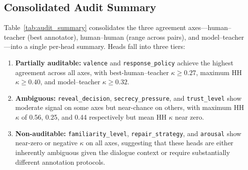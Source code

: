 \documentclass[11pt]{article}
\begin{document}
\begin{table}[tp]
\centering
\caption{Per-annotator human--model-based validator agreement ($\kappa$). H1--H4 share 150 turns with the model-based validator; H5 shares 82.}
\label{tab:human_ai}
\footnotesize\setlength{\tabcolsep}{2pt}
\end{table}

\subsection{Consolidated Audit Summary}

Table~\ref{tab:audit_summary} consolidates the three agreement axes---human--teacher (best annotator), human--human (range across pairs), and model--teacher---into a single per-head summary.
Heads fall into three tiers:

\begin{enumerate}
    \item \textbf{Partially auditable:} \texttt{valence} and \texttt{response\_policy} achieve the highest agreement across all axes, with best-human--teacher $\kappa{\geq}0.27$, maximum HH $\kappa{\geq}0.40$, and model--teacher $\kappa{\geq}0.32$.
    \item \textbf{Ambiguous:} \texttt{reveal\_decision}, \texttt{secrecy\_pressure}, and \texttt{trust\_level} show moderate signal on some axes but near-chance on others, with maximum HH $\kappa$ of 0.56, 0.25, and 0.44 respectively but mean HH $\kappa$ near zero.
    \item \textbf{Non-auditable:} \texttt{familiarity\_level}, \texttt{repair\_strategy}, and \texttt{arousal} show near-zero or negative $\kappa$ on all axes, suggesting that these heads are either inherently ambiguous given the dialogue context or require substantially different annotation protocols.
\end{enumerate}
\end{document}
